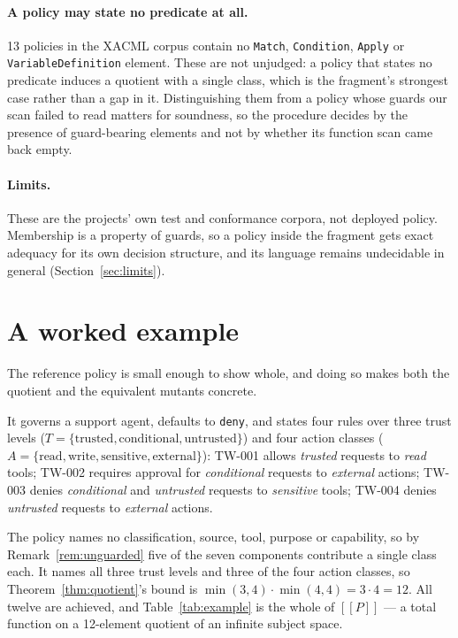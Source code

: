 \documentclass[11pt,a4paper]{article}
\theoremstyle{plain}
\theoremstyle{definition}
\theoremstyle{remark}
\newcommand{\sem}[1]{[\![#1]\!]}
\begin{document}
\paragraph{A policy may state no predicate at all.} 13 policies in the XACML corpus contain
no \texttt{Match}, \texttt{Condition}, \texttt{Apply} or \texttt{VariableDefinition}
element. These are not unjudged: a policy that states no predicate induces a quotient with a
single class, which is the fragment's strongest case rather than a gap in it. Distinguishing
them from a policy whose guards our scan failed to read matters for soundness, so the
procedure decides by the presence of guard-bearing elements and not by whether its function
scan came back empty.

\paragraph{Limits.} These are the projects' own test and conformance corpora, not deployed
policy. Membership is a property of guards, so a policy inside the fragment gets exact
adequacy for its own decision structure, and its language remains undecidable in general
(Section~\ref{sec:limits}).

\section{A worked example}
\label{sec:example}

The reference policy is small enough to show whole, and doing so makes both the quotient and
the equivalent mutants concrete.

It governs a support agent, defaults to \texttt{deny}, and states four rules over three
trust levels ($T = \{\text{trusted}, \text{conditional}, \text{untrusted}\}$) and four
action classes ($A = \{\text{read}, \text{write}, \text{sensitive}, \text{external}\}$):
TW-001 allows \emph{trusted} requests to \emph{read} tools; TW-002 requires approval for
\emph{conditional} requests to \emph{external} actions; TW-003 denies \emph{conditional} and
\emph{untrusted} requests to \emph{sensitive} tools; TW-004 denies \emph{untrusted} requests
to \emph{external} actions.

The policy names no classification, source, tool, purpose or capability, so by
Remark~\ref{rem:unguarded} five of the seven components contribute a single class each. It
names all three trust levels and three of the four action classes, so
Theorem~\ref{thm:quotient}'s bound is $\min(3, 4) \cdot \min(4, 4) = 3 \cdot 4 = 12$. All
twelve are achieved, and Table~\ref{tab:example} is the whole of $\sem{P}$ --- a total
function on a 12-element quotient of an infinite subject space.
\end{document}
